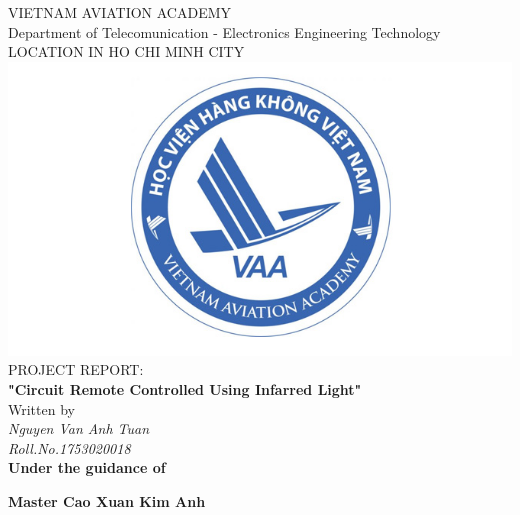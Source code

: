 \documentclass[a4paper]{report}
\begin{document}
    \centering
    \LARGE{\textsc{VIETNAM AVIATION ACADEMY}} \\
    \vspace{3mm}
    \normalsize{Department of Telecomunication - Electronics Engineering Technology} \\
    \vspace{3mm}
    \large{LOCATION IN HO CHI MINH CITY} \\
    \vspace{3mm}
    \includegraphics[scale=0.3]{download.jpg} \\
    \vspace{3mm}
    \normalsize{PROJECT REPORT:} \\
    \vspace{15mm}
    \huge{\textbf{"Circuit Remote Controlled Using Infarred Light"}} \\
    \vspace{20mm}
    \normalsize{Written by} \\
    \vspace{3mm}
    \large{\textit{Nguyen Van Anh Tuan}} \\ 
    \vspace{3mm}
    \textit{\large{Roll.No.1753020018}} \\
    \vspace{15mm}
    \textbf{\large{Under the guidance of}} \\
    \vspace{10mm}
    \centerline{\textbf{\large{Master Cao Xuan Kim Anh}}}

    \pagestyle{fancy}
    \fancyhf{}
    \cfoot{\today}
    \renewcommand{\headrulewidth}{2pt}
    \renewcommand{\footrulewidth}{1pt}
\end{document}
